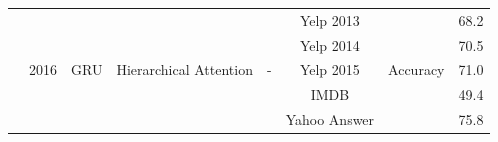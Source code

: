 \documentclass[12pt, a4paper, oneside]{report}
\begin{document}
\begin{tiny}
\begin{latin}
\begin{longtable}{|c|c|c|c|c|c|cc|}
        \multirow{6}{*}{\cite{yang-etal-2016-hierarchical}}  & \multirow{6}{*}{2016} & \multirow{6}{*}{GRU}              & \multirow{6}{*}{Hierarchical Attention} & \multirow{6}{*}{-}                                                                                     & Yelp 2013                             & \multicolumn{1}{c|}{\multirow{6}{*}{Accuracy}}                                                                                     & 68.2   \\ \cline{6-6} \cline{8-8} 
                                                                              &                       &                                   &                                         &                                                                                                        & Yelp 2014                             & \multicolumn{1}{c|}{}                                                                                                              & 70.5   \\ \cline{6-6} \cline{8-8} 
                                                                              &                       &                                   &                                         &                                                                                                        & Yelp 2015                             & \multicolumn{1}{c|}{}                                                                                                              & 71.0   \\ \cline{6-6} \cline{8-8} 
                                                                              &                       &                                   &                                         &                                                                                                        & IMDB                                  & \multicolumn{1}{c|}{}                                                                                                              & 49.4   \\ \cline{6-6} \cline{8-8} 
                                                                              &                       &                                   &                                         &                                                                                                        & Yahoo Answer                          & \multicolumn{1}{c|}{}                                                                                                              & 75.8   \\ \cline{6-6} \cline{8-8} 

\end{longtable}
\end{latin}
\end{tiny}
\end{document}
